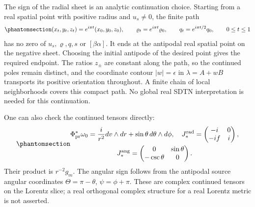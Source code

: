 \documentclass[
  english,
  11pt,
  reqno]{amsart}
\begin{document}
The sign of the radial sheet is an analytic continuation choice.
Starting from a real spatial point with positive radius and \(u_s\ne0\),
the finite path
\begin{equation}\protect\phantomsection\label{eq:sh-r1-sheet-path}{
 (x_t,y_t,z_t)=e^{i\pi t}(x_0,y_0,z_0),\qquad
 \varrho_t=e^{i\pi t}\varrho_0,\qquad
 q_t=e^{i\pi t/2}q_0,\qquad 0\le t\le1
}\end{equation} has no zero of \(u_s,\varrho,q,s\) or \([\beta\alpha]\).
It ends at the antipodal real spatial point on the negative sheet.
Choosing the initial antipode of the desired point gives the required
endpoint. The ratios \(z_\pm\) are constant along the path, so the
continued poles remain distinct, and the coordinate contour
\(|w|=\epsilon\) in \(\lambda=A+wB\) transports its positive orientation
throughout. A finite chain of local neighborhoods covers this compact
path. No global real SDTN interpretation is needed for this
continuation.

One can also check the continued tensors directly:
\begin{equation}\protect\phantomsection\label{eq:sh-r1-continued-structure}{\begin{gathered}
\Phi_{\rm pr}^*\omega_0=\frac i{r^2}dv\wedge dr
                          +\sin\theta\,d\theta\wedge d\phi,
 \quad
 J_*^{\rm rad}=\begin{pmatrix}-i&0\\-if&i\end{pmatrix}, \\
J_*^{\rm ang}=\begin{pmatrix}0&\sin\theta\\-\csc\theta&0\end{pmatrix}.
\end{gathered}}\end{equation} Their product is \(r^{-2}g_m\). The angular sign follows
from the antipodal source angular coordinates \(\Theta=\pi-\theta\),
\(\psi=\phi+\pi\). These are complex continued tensors on the Lorentz
slice; a real orthogonal complex structure for a real Lorentz metric is
not asserted.
\end{document}
